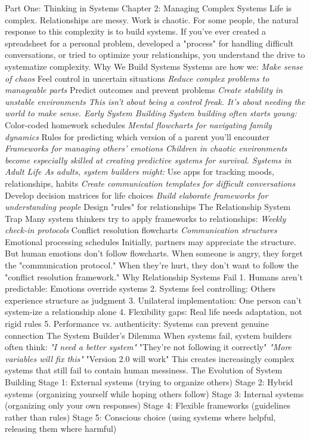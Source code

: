 \documentclass[12pt]{book}
\begin{document}
Part One: Thinking in Systems
Chapter 2: Managing Complex Systems
Life is complex. Relationships are messy. Work is chaotic. For some people, the natural response to this complexity is to build systems.
If you've ever created a spreadsheet for a personal problem, developed a "process" for handling difficult conversations, or tried to optimize your relationships, you understand the drive to systematize complexity.
Why We Build Systems
Systems are how we:
\textit{ Make sense of chaos
} Feel control in uncertain situations
\textit{ Reduce complex problems to manageable parts
} Predict outcomes and prevent problems
\textit{ Create stability in unstable environments
This isn't about being a control freak. It's about needing the world to make sense.
Early System Building
System building often starts young:
} Color-coded homework schedules
\textit{ Mental flowcharts for navigating family dynamics
} Rules for predicting which version of a parent you'll encounter
\textit{ Frameworks for managing others' emotions
Children in chaotic environments become especially skilled at creating predictive systems for survival.
Systems in Adult Life
As adults, system builders might:
} Use apps for tracking moods, relationships, habits
\textit{ Create communication templates for difficult conversations
} Develop decision matrices for life choices
\textit{ Build elaborate frameworks for understanding people
} Design "rules" for relationships
The Relationship System Trap
Many system thinkers try to apply frameworks to relationships:
\textit{ Weekly check-in protocols
} Conflict resolution flowcharts
\textit{ Communication structures
} Emotional processing schedules
Initially, partners may appreciate the structure. But human emotions don't follow flowcharts. When someone is angry, they forget the "communication protocol." When they're hurt, they don't want to follow the "conflict resolution framework."
Why Relationship Systems Fail
1. Humans aren't predictable: Emotions override systems
2. Systems feel controlling: Others experience structure as judgment
3. Unilateral implementation: One person can't system-ize a relationship alone
4. Flexibility gaps: Real life needs adaptation, not rigid rules
5. Performance vs. authenticity: Systems can prevent genuine connection
The System Builder's Dilemma
When systems fail, system builders often think:
\textit{ "I need a better system"
} "They're not following it correctly"
\textit{ "More variables will fix this"
} "Version 2.0 will work"
This creates increasingly complex systems that still fail to contain human messiness.
The Evolution of System Building
Stage 1: External systems (trying to organize others) Stage 2: Hybrid systems (organizing yourself while hoping others follow) Stage 3: Internal systems (organizing only your own responses) Stage 4: Flexible frameworks (guidelines rather than rules) Stage 5: Conscious choice (using systems where helpful, releasing them where harmful)
\end{document}

